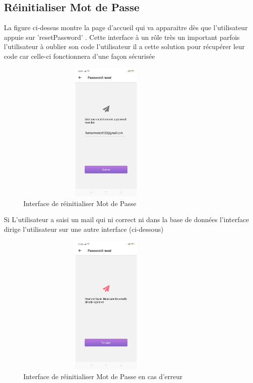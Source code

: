 \subsection{Réinitialiser Mot de Passe }
La figure ci-dessus montre la page d’accueil qui va apparaitre dès que l'utilisateur appuie sur 'resetPassword'  . Cette interface  à un rôle très un important parfois l'utilisateur à oublier son code l'utilisateur il a cette  solution pour récupérer leur code car celle-ci fonctionnera d'une façon sécurisée 
\begin{figure}[H]
  \centering
\includegraphics[width=9cm,height=7cm,keepaspectratio]{Application/err2.png}
\caption{Interface de réinitialiser Mot de Passe}
\end{figure}
Si L'utilisateur a saisi un mail qui ni correct ni dans la base de données l'interface dirige l'utilisateur sur une autre   interface (ci-dessous)
\begin{figure}[H]
  \centering
\includegraphics[width=9cm,height=7cm,keepaspectratio]{Application/ert.png}
\caption{Interface de réinitialiser Mot de Passe en cas d'erreur}
\end{figure}



